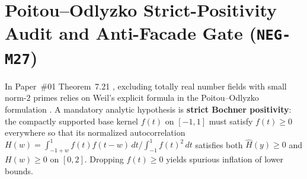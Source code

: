 \documentclass[11pt]{amsart}
\numberwithin{equation}{section}
\theoremstyle{plain}
\theoremstyle{definition}\newtheorem{definition}[theorem]{Definition}
\theoremstyle{remark}\newtheorem{remark}[theorem]{Remark}
\newcommand{\Q}{\mathbb{Q}}
\begin{document}
\begin{table}[htbp]
\centering
\caption{Complete census of all $19$ genus-$25$ $3$-adic Borel Shimura curves $X_0^D(N)$ over $\Q$ ($3\mid D, \gcd(D,N)=1$), highlighting the $9$ torsion-free $(288,0,0)$ curves (all $19/19$ excluded for $Z$ by \texttt{PC-II} Theorem~7.3).}
\label{tab:genus25}
\footnotesize
\setlength{\tabcolsep}{4.5pt}
\end{table}

\section{Poitou--Odlyzko Strict-Positivity Audit and Anti-Facade Gate (\texorpdfstring{\texttt{NEG-M27}}{NEG-M27})}\label{sec:poitou}
In Paper~\#01 Theorem~7.21 \cite{ergentics2026pc}, excluding totally real number fields with small norm-$2$ primes relies on Weil's explicit formula in the Poitou--Odlyzko formulation \cite{poitou1977,odlyzko1990}. A mandatory analytic hypothesis is \textbf{strict Bochner positivity}: the compactly supported base kernel $f(t)$ on $[-1,1]$ must satisfy $f(t)\ge 0$ everywhere so that its normalized autocorrelation $H(w) = \int_{-1+w}^1 f(t)f(t-w)\,dt / \int_{-1}^1 f(t)^2\,dt$ satisfies both $\widehat H(y)\ge 0$ and $H(w)\ge 0$ on $[0,2]$. Dropping $f(t)\ge 0$ yields spurious inflation of lower bounds.
\end{document}
